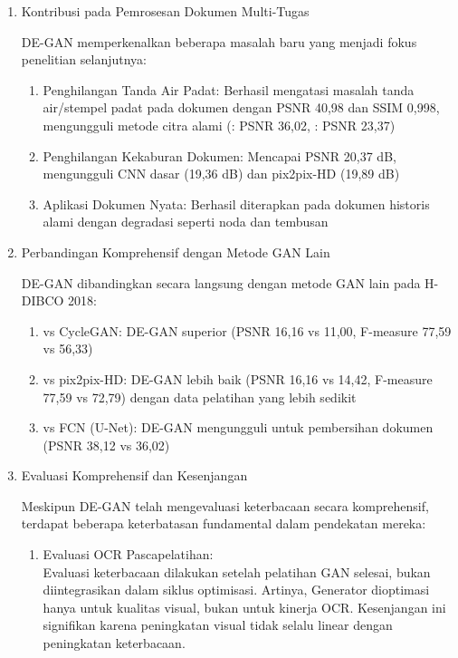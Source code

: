 \documentclass[12pt,a4paper]{article}
\begin{document}
\begin{enumerate}[leftmargin=*, labelindent=0pt, itemsep=1ex, topsep=0pt]

\item Kontribusi pada Pemrosesan Dokumen Multi-Tugas

DE-GAN memperkenalkan beberapa masalah baru yang menjadi fokus penelitian selanjutnya:

\begin{enumerate}[leftmargin=1.5em, labelsep=0.5em, itemindent=0pt, label=\alph*., topsep=0pt, parsep=0pt, itemsep=0pt]
      \item Penghilangan Tanda Air Padat: Berhasil mengatasi masalah tanda air/stempel padat pada dokumen dengan PSNR 40,98 dan SSIM 0,998, mengungguli metode citra alami (\parencite{dekel2024}: PSNR 36,02, \parencite{wu2023}: PSNR 23,37)
      \item Penghilangan Kekaburan Dokumen: Mencapai PSNR 20,37 dB, mengungguli CNN dasar (19,36 dB) dan pix2pix-HD (19,89 dB)
      \item Aplikasi Dokumen Nyata: Berhasil diterapkan pada dokumen historis alami dengan degradasi seperti noda dan tembusan
\end{enumerate}

\item Perbandingan Komprehensif dengan Metode GAN Lain

DE-GAN dibandingkan secara langsung dengan metode GAN lain pada H-DIBCO 2018:

\begin{enumerate}[leftmargin=1.5em, labelsep=0.5em, itemindent=0pt, label=\alph*., topsep=0pt, parsep=0pt, itemsep=0pt]
      \item vs CycleGAN: DE-GAN superior (PSNR 16,16 vs 11,00, F-measure 77,59 vs 56,33)
      \item vs pix2pix-HD: DE-GAN lebih baik (PSNR 16,16 vs 14,42, F-measure 77,59 vs 72,79) dengan data pelatihan yang lebih sedikit
      \item vs FCN (U-Net): DE-GAN mengungguli untuk pembersihan dokumen (PSNR 38,12 vs 36,02)
\end{enumerate}

\item Evaluasi Komprehensif dan Kesenjangan

Meskipun DE-GAN telah mengevaluasi keterbacaan secara komprehensif, terdapat beberapa keterbatasan fundamental dalam pendekatan mereka:

\begin{enumerate}[leftmargin=1.5em, labelsep=0.5em, itemindent=0pt, label=\alph*., topsep=0pt, parsep=0pt, itemsep=0pt]
      \item Evaluasi OCR Pascapelatihan: \mbox{}\\[0.1em]
            Evaluasi keterbacaan dilakukan setelah pelatihan GAN selesai, bukan diintegrasikan dalam siklus optimisasi. Artinya, Generator dioptimasi hanya untuk kualitas visual, bukan untuk kinerja OCR. Kesenjangan ini signifikan karena peningkatan visual tidak selalu linear dengan peningkatan keterbacaan.


\end{enumerate}
\end{enumerate}
\end{document}
